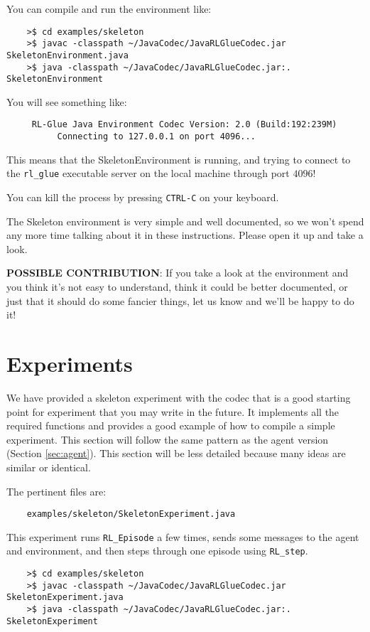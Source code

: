 \documentclass[11pt]{article}
\begin{document}
You can compile and run the environment like:
\begin{verbatim}
	>$ cd examples/skeleton
	>$ javac -classpath ~/JavaCodec/JavaRLGlueCodec.jar SkeletonEnvironment.java
	>$ java -classpath ~/JavaCodec/JavaRLGlueCodec.jar:. SkeletonEnvironment
\end{verbatim}

You will see something like:
\begin{verbatim}
     RL-Glue Java Environment Codec Version: 2.0 (Build:192:239M)
          Connecting to 127.0.0.1 on port 4096...
\end{verbatim}

This means that the SkeletonEnvironment is running, and trying to connect to the \texttt{rl\_glue} executable server on the local machine through port $4096$! 

You can kill the process by pressing \texttt{CTRL-C} on your keyboard.


The Skeleton environment is very simple and well documented, so we won't spend any more time talking about it in these instructions.
Please open it up and take a look.

\textbf{POSSIBLE CONTRIBUTION}: If you take a look at the environment and you think it's not easy to understand, think it could be better documented, 
or just that it should do some fancier things, let us know and we'll be happy to do it!


\section{Experiments}
We have provided a skeleton experiment with the codec that is a good starting point for experiment that you may write in the future.
It implements all the required functions and provides a good example of how to compile a simple experiment.  This section will follow the same 
pattern as the agent version (Section \ref{sec:agent}).  This section will be less detailed because many ideas are similar or identical.

The pertinent files are:
\begin{verbatim}
	examples/skeleton/SkeletonExperiment.java
\end{verbatim}

This experiment runs \texttt{RL\_Episode} a few times, sends some messages to the agent and environment, and then steps through one episode using \texttt{RL\_step}.

\begin{verbatim}
	>$ cd examples/skeleton
	>$ javac -classpath ~/JavaCodec/JavaRLGlueCodec.jar SkeletonExperiment.java
	>$ java -classpath ~/JavaCodec/JavaRLGlueCodec.jar:. SkeletonExperiment
\end{verbatim}
\end{document}
